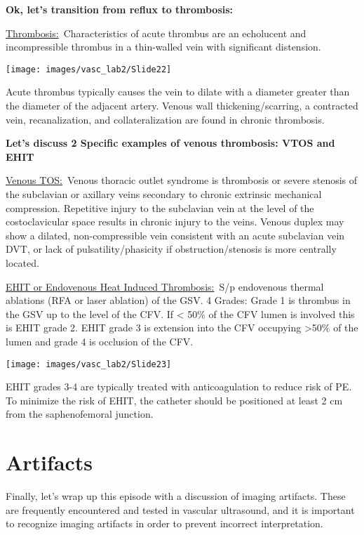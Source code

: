 \documentclass[
]{book}
\begin{document}
\textbf{Ok, let's transition from reflux to thrombosis:}

\uline{Thrombosis:}~Characteristics of acute thrombus are an
echolucent and incompressible thrombus in a thin-walled vein with
significant distension.

\texttt{[image: images/vasc\_lab2/Slide22]}

Acute thrombus typically causes the vein to dilate with a diameter
greater than the diameter of the adjacent artery. Venous wall
thickening/scarring, a contracted vein, recanalization, and
collateralization are found in chronic thrombosis.

\textbf{Let's discuss 2 Specific examples of venous thrombosis: VTOS and
EHIT}

\uline{Venous TOS:}~Venous thoracic outlet syndrome is thrombosis
or severe stenosis of the subclavian or axillary veins secondary to
chronic extrinsic mechanical compression. Repetitive injury to the
subclavian vein at the level of the costoclavicular space results in
chronic injury to the veins. Venous duplex may show a dilated,
non-compressible vein consistent with an acute subclavian vein DVT, or
lack of pulsatility/phasicity if obstruction/stenosis is more centrally
located.

\uline{EHIT or Endovenous Heat Induced Thrombosis:}~S/p endovenous
thermal ablations (RFA or laser ablation) of the GSV. 4 Grades: Grade 1
is thrombus in the GSV up to the level of the CFV. If \textless{} 50\% of the CFV
lumen is involved this is EHIT grade 2. EHIT grade 3 is extension into
the CFV occupying \textgreater50\% of the lumen and grade 4 is occlusion of the
CFV.

\texttt{[image: images/vasc\_lab2/Slide23]}

EHIT grades 3-4 are typically treated with anticoagulation to reduce
risk of PE. To minimize the risk of EHIT, the catheter should be
positioned at least 2 cm from the saphenofemoral junction.

\hypertarget{artifacts}{%
\section{Artifacts}\label{artifacts}}

Finally, let's wrap up this episode with a discussion of imaging
artifacts. These are frequently encountered and tested in vascular
ultrasound, and it is important to recognize imaging artifacts in order
to prevent incorrect interpretation.
\end{document}

